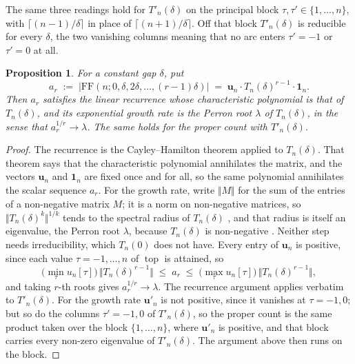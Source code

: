\documentclass[11pt, a4paper, abstract=yes]{scrartcl}
\theoremstyle{definition}
\theoremstyle{remark}
\theoremstyle{plain}
\newtheorem{proposition}[definition]{Proposition}
\newcommand{\vek}[1]{\boldsymbol{#1}}
\newcommand{\tp}{\operatorname{top}}
\let\autocite\cite
\begin{document}
The same three readings hold for \(T'_n(\delta)\) on the principal block
\(\tau,\tau'\in\lbrace1,\dots,n\rbrace\), with \(\lceil(n-1)/\delta\rceil\) in place of
\(\lceil(n+1)/\delta\rceil\). Off that block \(T'_n(\delta)\) is reducible for every \(\delta\),
the two vanishing columns meaning that no arc enters \(\tau'=-1\) or \(\tau'=0\) at all.

\begin{proposition}
For a constant gap \(\delta\), put
\begin{equation}\label{eq:def-ar}
  a_r\;:=\;\lvert\mathrm{FF}(n;0,\delta,2\delta,\dots,(r-1)\delta)\rvert
  \;=\;\vek u_n\cdot T_n(\delta)^{r-1}\cdot\vek 1_n .
\end{equation}
Then \(a_r\) satisfies the linear recurrence whose characteristic polynomial is
that of \(T_n(\delta)\), and its exponential growth rate is the Perron root \(\lambda\) of
\(T_n(\delta)\), in the sense that \(a_r^{1/r}\to\lambda\). The same holds for the proper count with
\(T'_n(\delta)\).
\label{prop-recurrence}
\end{proposition}

\begin{proof}
The recurrence is the Cayley--Hamilton theorem applied to \(T_n(\delta)\). That theorem says that the
characteristic polynomial annihilates the matrix, and the vectors \(\vek u_n\) and \(\vek 1_n\) are
fixed once and for all, so the same polynomial annihilates the scalar sequence \(a_r\). For the
growth rate, write \(\Vert M\Vert\) for the sum of the entries of a non-negative matrix \(M\); it is
a norm on non-negative matrices, so \(\Vert T_n(\delta)^k\Vert^{1/k}\) tends to the spectral radius
of \(T_n(\delta)\) \autocite[Theorem 5.7.10]{HornJohnson2013}, and that radius is itself an
eigenvalue, the Perron root \(\lambda\), because \(T_n(\delta)\) is non-negative
\autocite[Theorem 8.3.1]{HornJohnson2013}. Neither step needs irreducibility, which \(T_n(0)\) does
not have. Every entry of
\(\vek u_n\) is positive, since each value \(\tau=-1,\dots,n\) of \(\tp\) is attained, so
\[
  \bigl(\min_\tau u_n[\tau]\bigr)\,\Vert T_n(\delta)^{r-1}\Vert\;\le\;a_r\;\le\;
  \bigl(\max_\tau u_n[\tau]\bigr)\,\Vert T_n(\delta)^{r-1}\Vert ,
\]
and taking \(r\)-th roots gives \(a_r^{1/r}\to\lambda\). The recurrence argument applies verbatim to
\(T'_n(\delta)\). For the growth rate \(\vek u'_n\) is not positive, since it vanishes at \(\tau=-1,0\);
but so do the columns \(\tau'=-1,0\) of \(T'_n(\delta)\), so the proper count is the same product
taken over the block \(\lbrace1,\dots,n\rbrace\), where \(\vek u'_n\) is positive, and that block
carries every non-zero eigenvalue of \(T'_n(\delta)\). The argument above then runs on the block.
\end{proof}
\end{document}
